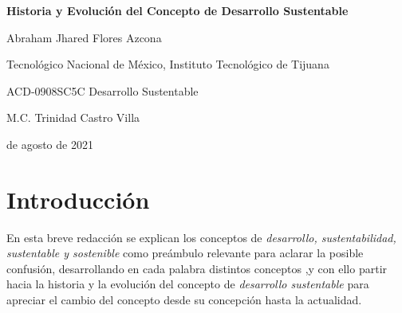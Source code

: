 \documentclass[letterpaper, 12pt]{article}
\begin{document}
        \begin{titlepage}
            \centering
            \vspace*{\fill}
            {\normalfont\bfseries Historia y Evolución del Concepto de Desarrollo Sustentable\par} %
            \vspace{1cm}
            {\normalfont Abraham Jhared Flores Azcona\par} %
            {\normalfont Tecnológico Nacional de México, Instituto Tecnológico de Tijuana\par} %
            {\normalfont ACD-0908SC5C Desarrollo Sustentable\par} %
            {\normalfont M.C. Trinidad Castro Villa \par} %
            { de agosto de 2021}
            \vspace*{\fill}
        \end{titlepage}

    \newpage %
        \setcounter{page}{2}
        \tableofcontents


    \newpage
    \section*{\centering Introducción}
    En esta breve redacción se explican los conceptos de \emph{desarrollo, sustentabilidad, sustentable y sostenible} como preámbulo relevante para aclarar la posible confusión, desarrollando en cada palabra distintos conceptos
    ,y con ello partir hacia la historia y la evolución del concepto de \emph{desarrollo sustentable} para apreciar el cambio del concepto desde su concepción hasta
    la actualidad.
    \par
\end{document}
